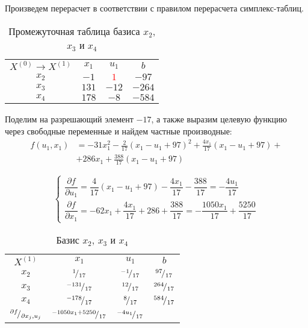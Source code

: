 Произведем перерасчет в соответствии с правилом перерасчета симплекс-таблиц. 

\begin{table}[H]
\begin{center}
	\def\tabcolsep{25pt}
	\def\arraystretch{1.3}
	\caption{Промежуточная таблица базиса $x_2$, $x_3$ и $x_4$}
	\begin{tabular}{|c||c|c||c|}
		\hline
		$X^{(0)} \to X^{(1)}$ & $x_1$ & $u_1$ & $b$ \\ 
		\hhline{|=#==#=|}
		$x_2$ & $-1$ & \textcolor{red}{\boldmath$1$} & $-97$ \\ 
		\hline
		$x_3$ & $131$ & $-12$ & $-264$ \\ 
		\hline
		$x_4$ & $178$ & $-8$ & $-584$ \\ 
		\hline
	\end{tabular}
\end{center}
\end{table}

Поделим на разрешающий элемент $-17$, а также выразим целевую функцию через свободные переменные и найдем частные производные:
\begin{align*}
	f(u_1, x_1) &= -31 x_1^2 - \frac{2}{17} \left(x_1 - u_1 + 97\right)^2 + \frac{4 x_1}{17} \left(x_1 - u_1 + 97\right) + \\ 
	&+ 286 x_1 + \frac{388}{17} \left(x_1 - u_1 + 97\right)
\end{align*}

\begin{equation*}
\begin{cases}
	\dfrac{\partial f}{\partial u_1} = \dfrac{4}{17} \left(x_1 - u_1 + 97\right) - \dfrac{4 x_1}{17} - \dfrac{388}{17} = -\dfrac{4 u_1}{17} \\[0.5cm]
	\dfrac{\partial f}{\partial x_1} = -62 x_1 + \dfrac{4 x_1}{17} + 286 + \dfrac{388}{17} = -\dfrac{1050 x_1}{17} + \dfrac{5250}{17}
\end{cases}
\end{equation*}

\begin{table}[H]
\begin{center}
	\def\tabcolsep{25pt}
	\def\arraystretch{1.3}
	\caption{Базис $x_2$, $x_3$ и $x_4$}
	\label{tab:simplex_1}
	\begin{tabular}{|c||c|c||c|}
		\hline
		$X^{(1)}$ & $x_1$ & $u_1$ & $b$ \\ 
		\hhline{|=#==#=|}
		$x_2$ & ${}^{1}\!/_{17}$ & ${}^{-1}\!/_{17}$ & ${}^{97}\!/_{17}$ \\ 
		\hline
		$x_3$ & \textcolor{red}{\boldmath${}^{-131}\!/_{17}$} & ${}^{12}\!/_{17}$ & ${}^{264}\!/_{17}$ \\ 
		\hline
		$x_4$ & ${}^{-178}\!/_{17}$ & ${}^{8}\!/_{17}$ & ${}^{584}\!/_{17}$ \\ 
		\hhline{|=#==#=|}
		${}^{\partial f}\!/_{\partial x_j, u_j}$ & ${}^{-1050 x_1 + 5250}\!/_{17}$ & ${}^{-4 u_1}\!/_{17}$ &  \\ 
		\hline
	\end{tabular}
\end{center}
\end{table}

